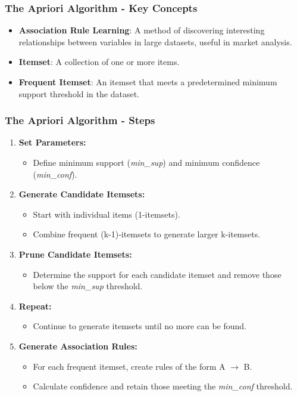 \documentclass[aspectratio=169]{beamer}
\begin{document}
\begin{frame}[fragile]
    \frametitle{The Apriori Algorithm - Key Concepts}
    \begin{itemize}
        \item \textbf{Association Rule Learning}: A method of discovering interesting relationships between variables in large datasets, useful in market analysis.
        \item \textbf{Itemset}: A collection of one or more items.
        \item \textbf{Frequent Itemset}: An itemset that meets a predetermined minimum support threshold in the dataset.
    \end{itemize}
\end{frame}

\begin{frame}[fragile]
    \frametitle{The Apriori Algorithm - Steps}
    \begin{enumerate}
        \item \textbf{Set Parameters:}
        \begin{itemize}
            \item Define minimum support (\textit{min\_sup}) and minimum confidence (\textit{min\_conf}).
        \end{itemize}
        \item \textbf{Generate Candidate Itemsets:}
        \begin{itemize}
            \item Start with individual items (1-itemsets).
            \item Combine frequent (k-1)-itemsets to generate larger k-itemsets.
        \end{itemize}
        \item \textbf{Prune Candidate Itemsets:}
        \begin{itemize}
            \item Determine the support for each candidate itemset and remove those below the \textit{min\_sup} threshold.
        \end{itemize}
        \item \textbf{Repeat:}
        \begin{itemize}
            \item Continue to generate itemsets until no more can be found.
        \end{itemize}
        \item \textbf{Generate Association Rules:}
        \begin{itemize}
            \item For each frequent itemset, create rules of the form A $\to$ B.
            \item Calculate confidence and retain those meeting the \textit{min\_conf} threshold.
        \end{itemize}
    \end{enumerate}
\end{frame}
\end{document}
